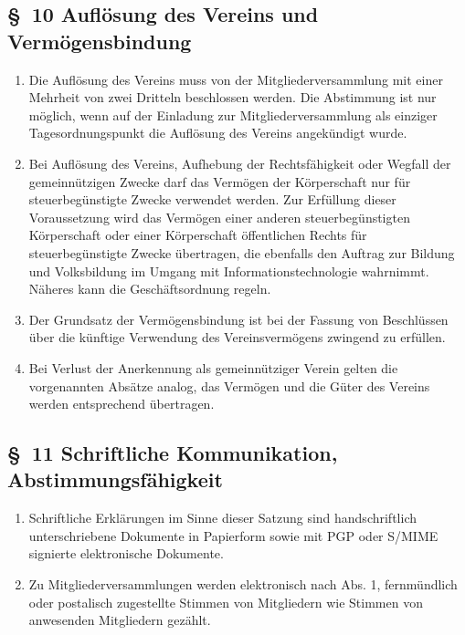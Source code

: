 \documentclass[10pt,a4paper]{scrartcl}
\begin{document}
\subsection*{\S \ 10 Aufl{\"o}sung des Vereins und Verm{\"o}gensbindung}
\begin{enumerate}
	\item Die Aufl{\"o}sung des Vereins muss von der Mitgliederversammlung mit einer Mehrheit von
		zwei Dritteln beschlossen werden. Die Abstimmung ist nur m{\"o}glich, wenn auf der Einladung
		zur Mitgliederversammlung als einziger Tagesordnungspunkt die Aufl{\"o}sung des Vereins
		angek{\"u}ndigt wurde.
	\item Bei Aufl{\"o}sung des Vereins, Aufhebung der Rechtsf{\"a}higkeit oder Wegfall der
		gemeinn{\"u}tzigen Zwecke darf das Verm{\"o}gen der K{\"o}rperschaft nur f{\"u}r
		steuerbeg{\"u}nstigte Zwecke verwendet werden. Zur Erf{\"u}llung dieser
		Voraussetzung wird das Verm{\"o}gen einer anderen steu\-er\-be\-g{\"u}ns\-tig\-ten
		K{\"o}rperschaft oder einer K{\"o}rperschaft {\"o}ffentlichen Rechts f{\"u}r
		steuerbeg{\"u}nstigte Zwecke {\"u}ber\-tra\-gen, die ebenfalls den Auftrag
		zur Bildung und Volksbildung im Umgang mit Informationstechnologie
		wahrnimmt. N{\"a}\-he\-res kann die Gesch{\"a}ftsordnung regeln.
	\item Der Grundsatz der Verm{\"o}gensbindung ist bei der Fassung von
		Beschl{\"u}ssen {\"u}ber die k{\"u}nf\-ti\-ge Verwendung des Vereinsverm{\"o}gens zwingend
		zu erf{\"u}llen.
	\item Bei Verlust der Anerkennung als gemeinn{\"u}tziger Verein gelten die vorgenannten Abs{\"a}tze analog, 
		das Verm{\"o}gen und die G{\"u}ter des Vereins werden entsprechend {\"u}bertragen.
\end{enumerate}
%
%
\subsection*{\S \ 11 Schriftliche Kommunikation, Abstimmungsf{\"a}higkeit}
\begin{enumerate}
	\item Schriftliche Erkl{\"a}rungen im Sinne dieser Satzung sind
		handschriftlich unterschriebene Dokumente in Papierform sowie
		mit PGP oder S/MIME signierte elektronische Dokumente.
	\item Zu Mitgliederversammlungen werden elektronisch nach Abs. 1,
		fernm{\"u}ndlich oder postalisch zugestellte Stimmen von Mitgliedern
		wie Stimmen von anwesenden Mitgliedern gez{\"a}hlt.
\end{enumerate}
\end{document}
